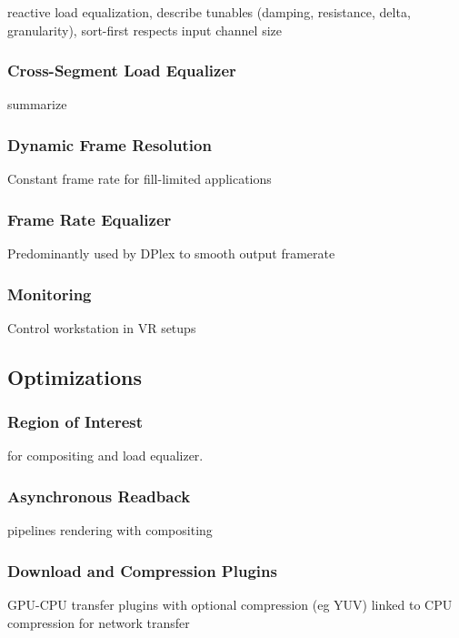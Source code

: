 \documentclass[journal]{vgtc}                %
\begin{document}
reactive load equalization, describe tunables (damping, resistance, delta,
granularity), sort-first respects input channel size

\subsubsection{Cross-Segment Load Equalizer}

summarize \cite{EEP:11}

\subsubsection{Dynamic Frame Resolution}

Constant frame rate for fill-limited applications

\subsubsection{Frame Rate Equalizer}

Predominantly used by DPlex to smooth output framerate

\subsubsection{Monitoring}

Control workstation in VR setups

\subsection{Optimizations}

\subsubsection{Region of Interest}

for compositing and load equalizer.

\subsubsection{Asynchronous Readback}

pipelines rendering with compositing

\subsubsection{Download and Compression Plugins}

GPU-CPU transfer plugins with optional compression (eg YUV) linked to CPU
compression for network transfer
\end{document}
